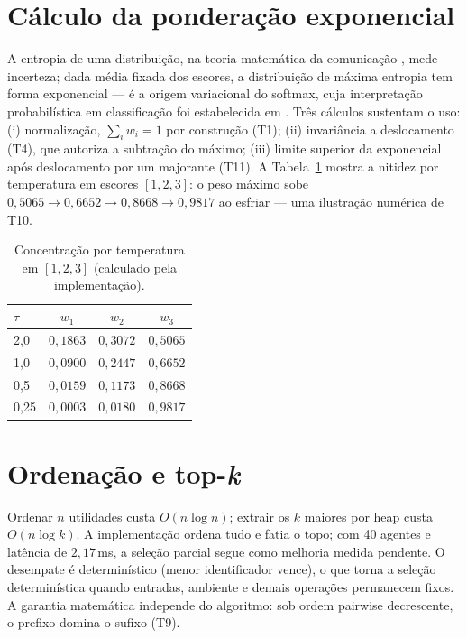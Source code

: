 \section{Cálculo da ponderação exponencial}
A entropia de uma distribuição, na teoria matemática da comunicação \cite{shannon1948}, mede incerteza; dada média fixada dos escores, a distribuição de máxima entropia tem forma exponencial \cite{jaynes1957} --- é a origem variacional do softmax, cuja interpretação probabilística em classificação foi estabelecida em \cite{bridle1990}. Três cálculos sustentam o uso: (i) normalização, $\sum_i w_i=1$ por construção (T1); (ii) invariância a deslocamento (T4), que autoriza a subtração do máximo; (iii) limite superior da exponencial após deslocamento por um majorante (T11). A Tabela~\ref{tab:temp} mostra a nitidez por temperatura em escores $[1,2,3]$: o peso máximo sobe $0{,}5065\to0{,}6652\to0{,}8668\to0{,}9817$ ao esfriar --- uma ilustração numérica de T10.
\begin{table}[htbp]
\fontsize{10}{12}\selectfont\SingleSpacing
\centering
\caption{Concentração por temperatura em $[1,2,3]$ (calculado pela implementação).}
\label{tab:temp}
\begin{tabular}{lccc}
\toprule
$\tau$ & $w_1$ & $w_2$ & $w_3$ \\
\midrule
2,0 & $0{,}1863$ & $0{,}3072$ & $0{,}5065$ \\
1,0 & $0{,}0900$ & $0{,}2447$ & $0{,}6652$ \\
0,5 & $0{,}0159$ & $0{,}1173$ & $0{,}8668$ \\
0,25 & $0{,}0003$ & $0{,}0180$ & $0{,}9817$ \\
\bottomrule
\end{tabular}
\end{table}
\section{Ordenação e top-\textit{k}}
Ordenar $n$ utilidades custa $O(n\log n)$; extrair os $k$ maiores por heap custa $O(n\log k)$. A implementação ordena tudo e fatia o topo; com 40 agentes e latência de $2{,}17$\,ms, a seleção parcial segue como melhoria medida pendente. O desempate é determinístico (menor identificador vence), o que torna a seleção determinística quando entradas, ambiente e demais operações permanecem fixos. A garantia matemática independe do algoritmo: sob ordem pairwise decrescente, o prefixo domina o sufixo (T9).
